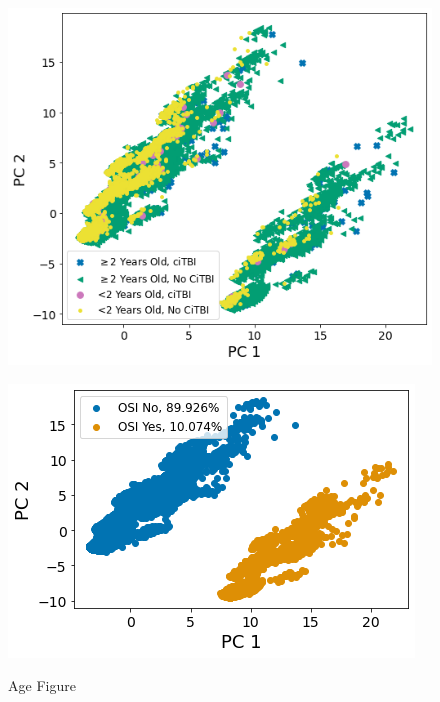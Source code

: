 \documentclass[11pt]{amsart}
\begin{document}
\begin{figure}
	\begin{minipage}[b]{0.5\linewidth}
		\centering
		\includegraphics[width=\textwidth]{pca_age_outcome.png}
		\label{fig:pca_age_outcome}
	\end{minipage}%
	\begin{minipage}[b]{0.5\linewidth}
		\centering
		\includegraphics[width=\textwidth]{pca_osi.png}
		\label{fig:pca_osi}
	\end{minipage}
	\caption{Age Figure}\label{fig:pca}
\end{figure}
\FloatBarrier
\end{document}

